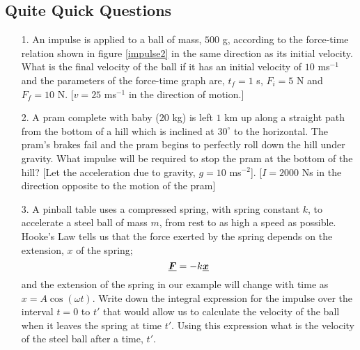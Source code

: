 \subsection*{Quite Quick Questions}
\begin{itemize}
\item[1.] An impulse is applied to a ball of mass, $500$ g, according to the force-time relation shown in figure \ref{impulse2}  in the same direction as its initial velocity.  What is the final velocity of the ball if it has an initial velocity of $10$ ms$^{-1}$ and the parameters of the force-time graph are, $t_f=1$ s, $F_i=5$ N and $F_f=10$ N. \color{red}[$v=25$ ms$^{-1}$ in the direction of motion.] \color{black}
\item[2.] A pram complete with baby ($20$ kg) is left $1$ km up along a straight path from the bottom of a hill which is inclined at $30^\circ$ to the horizontal. The pram's brakes fail and the pram begins to perfectly roll down the hill under gravity.   What impulse will be required to stop the pram at the bottom of the hill? [Let the acceleration due to gravity, $g=10$ ms$^{-2}$]. \color{red}[$I=2000$ Ns in the direction opposite to the motion of the pram]\color{black}
\item[3.] A pinball table uses a compressed spring, with spring constant $k$, to accelerate a steel ball of mass $m$, from rest to as high a speed as possible.   Hooke's Law tells us that the force exerted by the spring depends on the extension, $x$ of the spring;
\begin{equation}
{\mathit{\underline{\boldsymbol{F}}}}=-k{\mathit{\underline{\boldsymbol{x}}}} \nonumber
\end{equation}
and the extension of the spring in our example will change with time as $x=A\cos(\omega t)$.  Write down the integral expression for the impulse over the interval $t=0$ to $t'$ that would allow us to calculate the velocity of the ball when it leaves the spring at time $t'$. Using this expression what is the velocity of the steel ball after a time, $t'$.\color{red}\begin{equation}[v=\frac{-kA}{m}\int_0^{t'} \cos(\omega t) \d t\nonumber\end{equation} \begin{equation}v=\frac{kA\sin(\omega t')}{m\omega}]\nonumber\end{equation}

\end{itemize}

